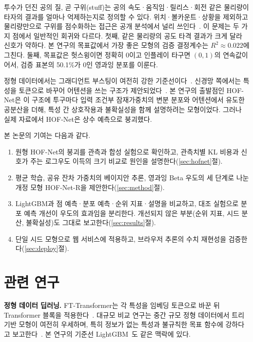 \documentclass[journal,a4paper,10pt]{IEEEtran}
\begin{document}
투수가 던진 공의 질, 곧 구위(stuff)는 공의 속도·움직임·릴리스·회전 같은 물리량이 타자의 결과를 얼마나 억제하는지로 정의할 수 있다. 위치·볼카운트·상황을 제외하고 물리량만으로 구위를 점수화하는 접근은 공개 분석에서 널리 쓰인다~\cite{fangraphs2023stuff}. 이 문제는 두 가지 점에서 일반적인 회귀와 다르다. 첫째, 같은 물리량의 공도 타격 결과가 크게 달라 신호가 약하다. 본 연구의 목표값에서 가장 좋은 모형의 검증 결정계수는 $R^2\approx0.022$에 그친다. 둘째, 목표값은 헛스윙이면 정확히 0이고 인플레이 타구면 $(0,1)$의 연속값이어서, 검증 표본의 50.1\%가 0인 영과잉 분포를 이룬다.

정형 데이터에서는 그래디언트 부스팅이 여전히 강한 기준선이다~\cite{ke2017lightgbm,grinsztajn2022tree}. 신경망 쪽에서는 특성을 토큰으로 바꾸어 어텐션을 쓰는 구조가 제안되었다~\cite{gorishniy2021revisiting}. 본 연구의 출발점인 HOF-Net은 이 구조에 투구마다 입력 조건부 잠재가중치의 변분 분포와 어텐션에서 유도한 공분산을 더해, 특성 간 상호작용과 불확실성을 함께 설명하려는 모형이었다. 그러나 실제 자료에서 HOF-Net은 상수 예측으로 붕괴했다.

본 논문의 기여는 다음과 같다.
\begin{enumerate}[leftmargin=*,itemsep=1pt,topsep=2pt]
\item 원형 HOF-Net의 붕괴를 관측과 합성 실험으로 확인하고, 관측치별 KL 비용과 신호가 주는 로그우도 이득의 크기 비교로 원인을 설명한다(\ref{sec:hofnet}절).
\item 평균 학습, 공유 잔차 가중치의 베이지안 추론, 영과잉 Beta 우도의 세 단계로 나눈 개정 모형 HOF-Net-R을 제안한다(\ref{sec:method}절).
\item LightGBM과 점 예측·분포 예측·순위 지표·설명을 비교하고, 대조 실험으로 분포 예측 개선이 우도의 효과임을 분리한다. 개선되지 않은 부분(순위 지표, 시드 분산, 불확실성)도 그대로 보고한다(\ref{sec:results}절).
\item 단일 시드 모형으로 웹 서비스에 적용하고, 브라우저 추론의 수치 재현성을 검증한다(\ref{sec:deploy}절).
\end{enumerate}

\section{관련 연구}
\label{sec:related}

\textbf{정형 데이터 딥러닝.} FT-Transformer는 각 특성을 임베딩 토큰으로 바꾼 뒤 Transformer 블록을 적용한다~\cite{gorishniy2021revisiting,vaswani2017attention}. 대규모 비교 연구는 중간 규모 정형 데이터에서 트리 기반 모형이 여전히 우세하며, 특히 정보가 없는 특성과 불규칙한 목표 함수에 강하다고 보고한다~\cite{grinsztajn2022tree}. 본 연구의 기준선 LightGBM~\cite{ke2017lightgbm}도 같은 맥락에 있다.
\end{document}
